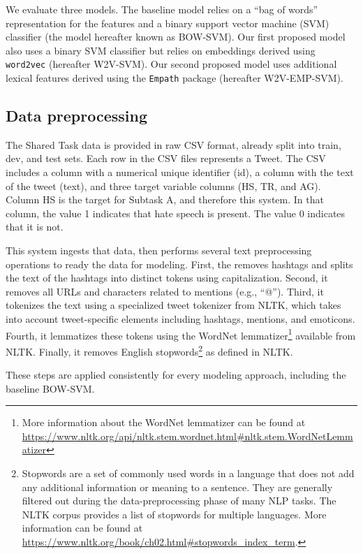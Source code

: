\documentclass[11pt,a4paper]{article}
\begin{document}
We evaluate three models. The baseline model relies on a “bag of words” representation for the features and a binary support vector machine (SVM) classifier (the model hereafter known as BOW-SVM). Our first proposed model also uses a binary SVM classifier but relies on embeddings derived using \verb|word2vec| (hereafter W2V-SVM). Our second proposed model uses additional lexical features derived using the \verb|Empath| package (hereafter W2V-EMP-SVM).


\subsection{Data preprocessing}
The Shared Task data is provided in raw CSV format, already split into train, dev, and test sets. Each row in the CSV files represents a Tweet. The CSV includes a column with a numerical unique identifier (id), a column with the text of the tweet (text), and three target variable columns (HS, TR, and AG). Column HS is the target for Subtask A, and therefore this system. In that column, the value 1 indicates that hate speech is present. The value 0 indicates that it is not.

This system ingests that data, then performs several text preprocessing operations to ready the data for modeling. First, the removes hashtags and splits the text of the hashtags into distinct tokens using capitalization. Second, it removes all URLs and characters related to mentions (e.g., “@”).  Third, it tokenizes the text using a specialized tweet tokenizer from NLTK, which takes into account tweet-specific elements including hashtags, mentions, and emoticons. Fourth, it lemmatizes these tokens using the WordNet lemmatizer\footnote{More information about the WordNet lemmatizer can be found at \url{https://www.nltk.org/api/nltk.stem.wordnet.html\#nltk.stem.WordNetLemmatizer}} available from NLTK. Finally, it removes English stopwords\footnote{Stopwords are a set of commonly used words in a language that does not add any additional information or meaning to a sentence. They are generally filtered out during the data-preprocessing phase of many NLP tasks. The NLTK corpus provides a list of stopwords for multiple languages. More information can be found at \url{https://www.nltk.org/book/ch02.html\#stopwords_index_term}.} as defined in NLTK.

These steps are applied consistently for every modeling approach, including the baseline BOW-SVM.
\end{document}
